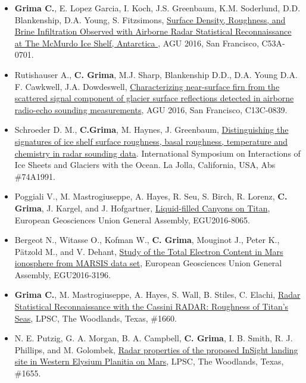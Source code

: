 \begin{itemize}
\item
  \textbf{Grima C.}, E. Lopez Garcia, I. Koch, J.S. Greenbaum, K.M.
  Soderlund, D.D. Blankenship, D.A. Young, S. Fitzsimons,
  \href{https://agu.confex.com/agu/fm16/meetingapp.cgi/Paper/197146}{
  Surface Density, Roughness, and Brine Infiltration Observed with
  Airborne Radar Statistical Reconnaissance at The McMurdo Ice Shelf,
  Antarctica }, AGU 2016, San Francisco, C53A-0701.
\item
  Rutishauser A., \textbf{C. Grima}, M.J. Sharp, Blankenship D.D., D.A.
  Young D.A. F. Cawkwell, J.A. Dowdeswell,
  \href{https://agu.confex.com/agu/fm16/meetingapp.cgi/Paper/152238}{Characterizing
  near-surface firn from the scattered signal component of glacier
  surface reflections detected in airborne radio-echo sounding
  measurements}, AGU 2016, San Francisco, C13C-0839.
\item
  Schroeder D. M., \textbf{C.Grima}, M. Haynes, J. Greenbaum,
  \href{http://www.igsoc.org/symposia/2016/lajolla/proceedings/procsfiles/procabstracts_69.html\#A1991}{Distinguishing
  the signatures of ice shelf surface roughness, basal roughness,
  temperature and chemistry in radar sounding data}. International
  Symposium on Interactions of Ice Sheets and Glaciers with the Ocean.
  La Jolla, California, USA, Abs \#74A1991.
\item
  Poggiali V., M. Mastrogiuseppe, A. Hayes, R. Seu, S. Birch, R. Lorenz,
  \textbf{C. Grima}, J. Kargel, and J. Hofgartner,
  \href{http://meetingorganizer.copernicus.org/EGU2016/EGU2016-8065.pdf}{Liquid-filled
  Canyons on Titan}, European Geosciences Union General Assembly,
  EGU2016-8065.
\item
  Bergeot N., Witasse O., Kofman W., \textbf{C. Grima}, Mouginot J.,
  Peter K., Pätzold M., and V. Dehant,
  \href{http://meetingorganizer.copernicus.org/EGU2016/EGU2016-3196.pdf}{Study
  of the Total Electron Content in Mars ionosphere from MARSIS data
  set}, European Geosciences Union General Assembly, EGU2016-3196.
\item
  \textbf{Grima C.}, M. Mastrogiuseppe, A. Hayes, S. Wall, B. Stiles, C.
  Elachi,
  \href{http://www.hou.usra.edu/meetings/lpsc2016/pdf/1660.pdf}{Radar
  Statistical Reconnaissance with the Cassini RADAR: Roughness of
  Titan's Seas}, LPSC, The Woodlands, Texas, \#1660.
\item
  N. E. Putzig, G. A. Morgan, B. A. Campbell, \textbf{C. Grima}, I. B.
  Smith, R. J. Phillips, and M. Golombek,
  \href{http://www.hou.usra.edu/meetings/lpsc2016/pdf/1655.pdf}{Radar
  properties of the proposed InSight landing site in Western Elysium
  Planitia on Mars}, LPSC, The Woodlands, Texas, \#1655.
\end{itemize}

